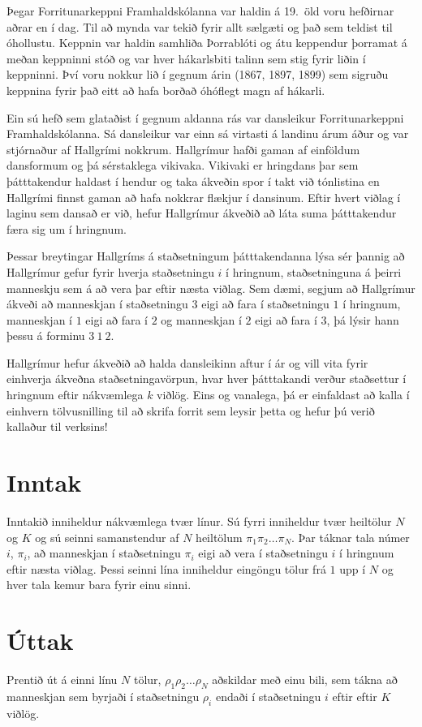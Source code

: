 Þegar Forritunarkeppni Framhaldskólanna var haldin á 19.\ öld voru hefðirnar
aðrar en í dag. Til að mynda var tekið fyrir allt sælgæti og það sem teldist
til óhollustu. Keppnin var haldin samhliða Þorrablóti og átu keppendur þorramat
á meðan keppninni stóð og var hver hákarlsbiti talinn sem stig fyrir liðin í
keppninni. Því voru nokkur lið í gegnum árin (1867, 1897, 1899) sem sigruðu keppnina fyrir það
eitt að hafa borðað óhóflegt magn af hákarli.

Ein sú hefð sem glataðist í gegnum aldanna rás var dansleikur Forritunarkeppni
Framhaldskólanna. Sá dansleikur var einn sá virtasti á landinu árum áður og var
stjórnaður af Hallgrími nokkrum. Hallgrímur hafði gaman af einföldum dansformum
og þá sérstaklega vikivaka. Vikivaki er hringdans þar sem þátttakendur haldast í hendur og taka
ákveðin spor í takt við tónlistina en Hallgrími finnst gaman að hafa nokkrar
flækjur í dansinum. Eftir hvert viðlag í laginu sem dansað er við, hefur
Hallgrímur ákveðið að láta suma þátttakendur færa sig um í hringnum.

Þessar breytingar Hallgríms á staðsetningum þátttakendanna lýsa sér þannig að
Hallgrímur gefur fyrir hverja staðsetningu $i$ í hringnum, staðsetninguna á
þeirri manneskju sem á að vera þar eftir næsta viðlag.  Sem dæmi, segjum að
Hallgrímur ákveði að manneskjan í staðsetningu $3$ eigi að fara í staðsetningu
$1$ í hringnum, manneskjan í $1$ eigi að fara í $2$ og manneskjan í $2$ eigi að
fara í $3$, þá lýsir hann þessu á forminu $3~1~2$.

Hallgrímur hefur ákveðið að halda dansleikinn aftur í ár og vill vita fyrir
einhverja ákveðna staðsetningavörpun, hvar hver þátttakandi verður staðsettur í
hringnum eftir nákvæmlega $k$ viðlög.  Eins og vanalega, þá er einfaldast að
kalla í einhvern tölvusnilling til að skrifa forrit sem leysir þetta og hefur
þú verið kallaður til verksins!

\section*{Inntak}
Inntakið inniheldur nákvæmlega tvær línur.  Sú fyrri inniheldur tvær heiltölur
$N$ og $K$ og sú seinni samanstendur af $N$ heiltölum $\pi_1 \pi_2 \dotsc \pi_N$.
Þar táknar tala númer $i$, $\pi_i$, að manneskjan í staðsetningu $\pi_i$ eigi að
vera í staðsetningu $i$ í hringnum eftir næsta viðlag.
Þessi seinni lína inniheldur
eingöngu tölur frá $1$ upp í $N$ og hver tala kemur bara fyrir einu sinni.

\section*{Úttak}
Prentið út á einni línu $N$ tölur, $\rho_1 \rho_2 \dotsc \rho_N$ aðskildar með
einu bili, sem tákna að manneskjan sem byrjaði í staðsetningu $\rho_i$
endaði í staðsetningu $i$ eftir eftir $K$ viðlög.

